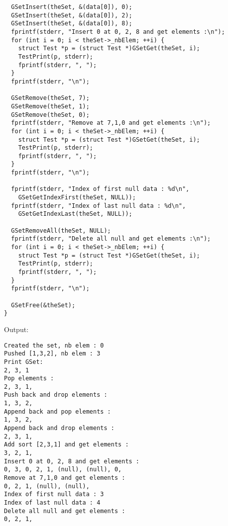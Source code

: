 \documentclass[12pt, a4paper]{article}
\begin{document}
\begin{scriptsize}
\begin{ttfamily}
\begin{lstlisting}
  GSetInsert(theSet, &(data[0]), 0);
  GSetInsert(theSet, &(data[0]), 2);
  GSetInsert(theSet, &(data[0]), 8);
  fprintf(stderr, "Insert 0 at 0, 2, 8 and get elements :\n");
  for (int i = 0; i < theSet->_nbElem; ++i) {
    struct Test *p = (struct Test *)GSetGet(theSet, i);
    TestPrint(p, stderr);
    fprintf(stderr, ", ");
  }
  fprintf(stderr, "\n");

  GSetRemove(theSet, 7);
  GSetRemove(theSet, 1);
  GSetRemove(theSet, 0);
  fprintf(stderr, "Remove at 7,1,0 and get elements :\n");
  for (int i = 0; i < theSet->_nbElem; ++i) {
    struct Test *p = (struct Test *)GSetGet(theSet, i);
    TestPrint(p, stderr);
    fprintf(stderr, ", ");
  }
  fprintf(stderr, "\n");

  fprintf(stderr, "Index of first null data : %d\n", 
    GSetGetIndexFirst(theSet, NULL));
  fprintf(stderr, "Index of last null data : %d\n", 
    GSetGetIndexLast(theSet, NULL));

  GSetRemoveAll(theSet, NULL);
  fprintf(stderr, "Delete all null and get elements :\n");
  for (int i = 0; i < theSet->_nbElem; ++i) {
    struct Test *p = (struct Test *)GSetGet(theSet, i);
    TestPrint(p, stderr);
    fprintf(stderr, ", ");
  }
  fprintf(stderr, "\n");

  GSetFree(&theSet);
}
\end{lstlisting}
\end{ttfamily}
\end{scriptsize}

Output:\\
\begin{scriptsize}
\begin{ttfamily}
\begin{lstlisting}
Created the set, nb elem : 0
Pushed [1,3,2], nb elem : 3
Print GSet:
2, 3, 1
Pop elements :
2, 3, 1, 
Push back and drop elements :
1, 3, 2, 
Append back and pop elements :
1, 3, 2, 
Append back and drop elements :
2, 3, 1, 
Add sort [2,3,1] and get elements :
3, 2, 1, 
Insert 0 at 0, 2, 8 and get elements :
0, 3, 0, 2, 1, (null), (null), 0, 
Remove at 7,1,0 and get elements :
0, 2, 1, (null), (null), 
Index of first null data : 3
Index of last null data : 4
Delete all null and get elements :
0, 2, 1, 
\end{lstlisting}
\end{ttfamily}
\end{scriptsize}
\end{document}
